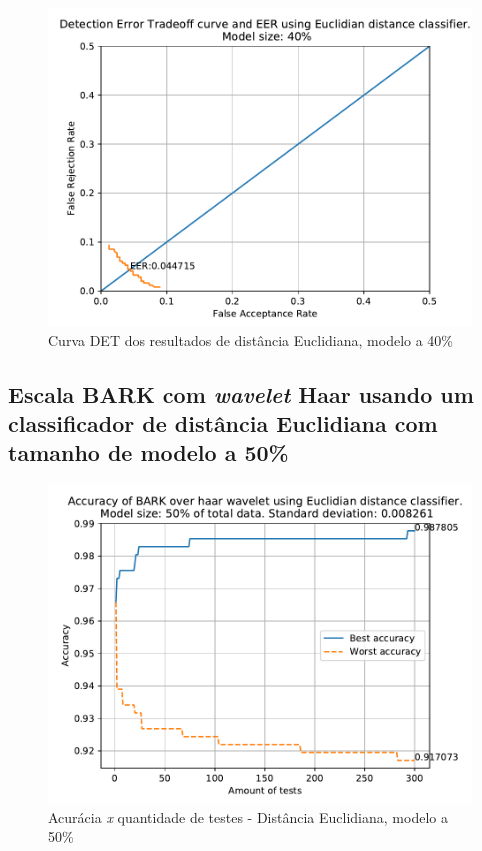 			\begin{figure}[!ht]
				\centering
				\includegraphics[width=.6\linewidth]{images/results/det/DET_for_classifier_Euclidian_40}
				\caption{Curva DET dos resultados de distância Euclidiana, modelo a 40\%}
				\label{fig:detforclassifiereuclidian40}
			\end{figure}

			\FloatBarrier
		\subsection{Escala BARK com \textit{wavelet} Haar usando um classificador de distância Euclidiana com tamanho de modelo a 50\%}
		
			
			
			\begin{figure}[!ht]
				\centering
				\includegraphics[width=.6\linewidth]{images/results/confusionMatrices/classifier_Euclidian_50}
				\caption{Acurácia \textit{x} quantidade de testes - Distância Euclidiana, modelo a 50\%}
				\label{fig:classifiereuclidian50}
			\end{figure}
		
